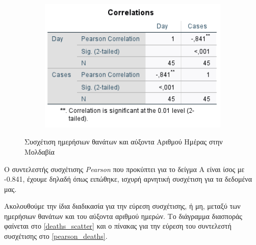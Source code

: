 \documentclass{article}
\begin{document}
    \begin{figure}[H]
        \centering
        \begin{adjustbox}{center}
        	\begin{subfigure}[c]{1\textwidth}    
        		\includegraphics[width=1\textwidth,height=\textheight,keepaspectratio]{media/2/correlation_cases.png}
        	\end{subfigure}%
        \end{adjustbox}
        \caption{Συσχέτιση ημερήσιων θανάτων και αύξοντα Αριθμού Ημέρας στην Μολδαβία}
    \label{pearson_cases}
    \end{figure}
    
    \vfill
    
    Ο συντελεστής συσχέτισης \emph{\foreignlanguage{english}{Pearson}} που προκύπτει για το δείγμα Α είναι ίσος με -0.841, έχουμε δηλαδή όπως ειπώθηκε, ισχυρή αρνητική συσχέτιση για τα δεδομένα μας.
    
    Ακολουθούμε την ίδια διαδικασία για την εύρεση συσχέτισης, ή μη, μεταξύ των ημερήσιων θανάτων και του αύξοντα αριθμού ημερών. Το διάγραμμα διασποράς φαίνεται στο \autoref{deaths_scatter} και ο πίνακας για την εύρεση του συντελεστή συσχέτισης στο \autoref{pearson_deaths}.
    
    \vfill
    \newpage
    
\end{document}
